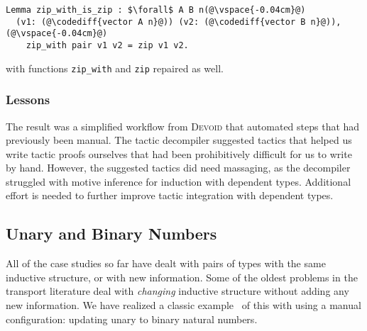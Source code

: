 \begin{lstlisting}[backgroundcolor=\color{cyan!30}]
Lemma zip_with_is_zip : $\forall$ A B n(@\vspace{-0.04cm}@)
  (v1: (@\codediff{vector A n}@)) (v2: (@\codediff{vector B n}@)),(@\vspace{-0.04cm}@)
    zip_with pair v1 v2 = zip v1 v2.
\end{lstlisting}
with functions \lstinline{zip_with} and \lstinline{zip} repaired as well.

\subsubsection{Lessons}


The result was a simplified workflow from \textsc{Devoid} that automated steps 
that had previously been manual.
The tactic decompiler suggested tactics that helped us write tactic proofs ourselves that had been
prohibitively difficult for us to write by hand.
However, the suggested tactics did need massaging, as the decompiler struggled with motive inference
for induction with dependent types.
Additional effort is needed to further improve tactic integration with dependent types.

\subsection{Unary and Binary Numbers}
\label{sec:bin}

All of the case studies so far have dealt with pairs of types with the same inductive structure,
or with new information.
Some of the oldest problems in the transport literature deal with \textit{changing} inductive
structure without adding any new information.
We have realized a classic example~\cite{magaud2000changing} of this with \toolname using a manual configuration:
updating unary to binary natural numbers.

